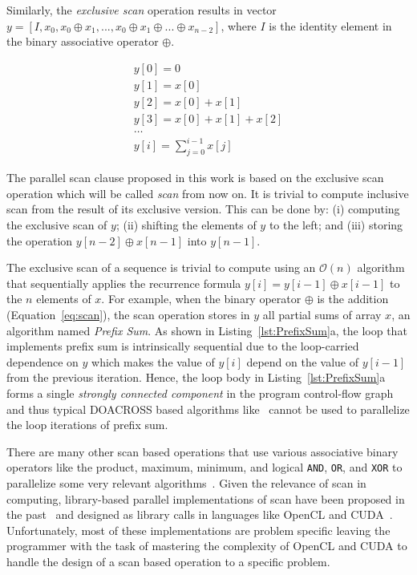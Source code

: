\documentclass[Ingles]{ic-tese-v1}
\newcommand{\req}[1]{Equation~\ref{eq:#1}}
\newcommand{\rlsts}[2]{Listing~\ref{lst:#1}{#2}}
\begin{document}
Similarly,  the  {\em  exclusive  scan} operation  results  in  vector
$y =  [ I, x_{0}, x_{0}  \oplus x_{1}, ... ,x_{0}  \oplus x_{1} \oplus
... \oplus x_{n-2}]$, where $I$ is  the identity element in the binary
associative operator  $\oplus$.

\begin{eqnarray}
y[0] = 0\nonumber\\
y[1] = x[0] \nonumber\\
y[2] = x[0] + x[1] \nonumber\\
y[3] = x[0] + x[1] + x[2] \nonumber\\
\dots\nonumber\\
y[i] = \sum_{j=0}^{i-1} x[j]
\label{eq:scan}
\end{eqnarray}

The  parallel scan clause  proposed in
this work  is based  on the  exclusive scan  operation which  will be
called \textit{scan} from now on.   It is trivial to compute inclusive
scan from  the result of its  exclusive version. This can  be done by:
(i) computing the exclusive scan of $y$; (ii) shifting the elements of
$y$    to    the   left;    and    (iii)    storing   the    operation
$y[n-2] \oplus x[n-1]$ into $y[n-1]$.

The exclusive scan of a sequence is trivial to compute using an $\mathcal{O}(n)$
algorithm   that   sequentially   applies   the   recurrence   formula
$y[i]  = y[i-1]  \oplus  x[i-1]$  to the  $n$  elements  of $x$.   For
example,   when  the   binary  operator   $\oplus$  is   the  addition
(\req{scan}), the  scan operation  stores in $y$  all partial  sums of
array  $x$,  an algorithm  named  \textit{Prefix  Sum}.  As  shown  in
\rlsts{PrefixSum}{a}, the  loop   that  implements   prefix  sum   is
intrinsically  sequential due  to the  loop-carried dependence  on $y$
which makes the  value of $y[i]$ depend on the  value of $y[i-1]$ from
the previous  iteration. Hence,  the loop body  in \rlsts{PrefixSum}{a}
forms a  single \textit{strongly  connected component} in  the program
control-flow  graph~\cite{flowgraph} and  thus typical  DOACROSS based
algorithms like~\cite{926166,344315} cannot  be used  to parallelize
the loop iterations of prefix sum.

There are many  other scan based operations that use various
associative  binary  operators  like the product,  maximum,  minimum,  and
logical  \texttt{AND}, \texttt{OR},  and  \texttt{XOR} to  parallelize
some                           very                           relevant
algorithms~\cite{NEEDLEMAN1970443,Crow:1984:STT:800031.808600,minimum}.
Given  the relevance  of  scan in  computing,  library-based  parallel
implementations    of    scan    have    been    proposed    in    the
past~\cite{dataparallel,  ScanAsPrimitive}  and  designed  as  library
calls   in  languages   like   OpenCL  and   CUDA~\cite{Sengupta:2007,
	Capannini:2011}.   Unfortunately, most  of these  implementations are
problem specific leaving the programmer with the task of mastering the
complexity of OpenCL and CUDA to handle the design of a scan
based operation to a specific problem.
\end{document}
